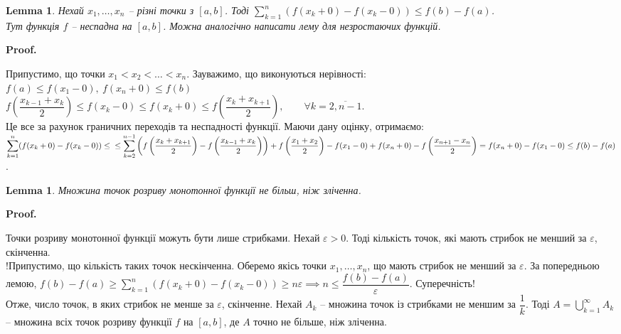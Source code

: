 \documentclass[a4paper, 10pt]{article}
\makeatletter
\def\qed{$\blacksquare$}
\theoremstyle{theoremdd}
\theoremstyle{theoremdd}
\theoremstyle{theoremdd}
\theoremstyle{theoremdd}
\theoremstyle{theoremdd}
\theoremstyle{theoremdd}
\theoremstyle{theoremdd}
\theoremstyle{theoremdd}
\newtheorem{lemma}[theorem]{Lemma}
\theoremstyle{theoremdd}
\renewenvironment{proof}[1][Proof.\\]{\par
\pushQED{\hfill \qed}%
\normalfont \topsep6\p@\@plus6\p@\relax
\trivlist
\item\relax
{\bfseries
#1\@addpunct{.}}\hspace\labelsep\ignorespaces
}{%
\popQED\endtrivlist\@endpefalse
}
\makeatother
\begin{document}
\begin{lemma}
\label{sum_of_jump_estimation}
Нехай $x_1,\dots,x_n$ -- різні точки з $[a,b]$. Тоді $\displaystyle\sum_{k=1}^n (f(x_k+0) - f(x_k-0)) \leq f(b) - f(a)$.\\
Тут функція $f$ -- неспадна на $[a,b]$. Можна аналогічно написати лему для незростаючих функцій.
\end{lemma}

\begin{proof}
Припустимо, що точки $x_1 < x_2 < \dots < x_n$. Зауважимо, що виконуються нерівності:\\
$f(a) \leq f(x_1-0),\ f(x_n+0) \leq f(b)$\\
$f\left( \dfrac{x_{k-1} + x_k}{2} \right) \leq f(x_k-0) \leq f(x_k+0) \leq f\left( \dfrac{x_k+x_{k+1}}{2} \right),\qquad \forall k = \overline{2,n-1}$.\\
Це все за рахунок граничних переходів та неспадності функції. Маючи дану оцінку, отримаємо:\\
$\displaystyle\sum_{k=1}^n (f(x_k+0) - f(x_k-0)) \leq \\ \leq \sum_{k=2}^{n-1} \left( f\left( \dfrac{x_k + x_{k+1}}{2}\right) - f\left( \dfrac{x_{k-1} + x_k}{2} \right) \right) + f\left( \dfrac{x_1+x_2}{2}\right) - f(x_1-0) + f(x_n+0) - f\left( \dfrac{x_{n+1}-x_n}{2}\right) = f(x_n+0) - f(x_1-0) \leq f(b) - f(a)$.
\end{proof}

\begin{lemma}
Множина точок розриву монотонної функції не більш, ніж зліченна.
\end{lemma}

\begin{proof}
Точки розриву монотонної функції можуть бути лише стрибками. Нехай $\varepsilon > 0$. Тоді кількість точок, які мають стрибок не менший за $\varepsilon$, скінченна.\\
!Припустимо, що кількість таких точок нескінченна. Оберемо якісь точки $x_1,\dots,x_n$, що мають стрибок не менший за $\varepsilon$. За попередньою лемою, $f(b) - f(a) \geq \displaystyle\sum_{k=1}^n (f(x_k+0) - f(x_k-0)) \geq n \varepsilon \implies n \leq \dfrac{f(b)-f(a)}{\varepsilon}$. Суперечність!\\
Отже, число точок, в яких стрибок не менше за $\varepsilon$, скінченне. Нехай $A_k$ -- множина точок із стрибками не меншим за $\dfrac{1}{k}$. Тоді $A = \displaystyle\bigcup_{k = 1}^\infty A_k$ -- множина всіх точок розриву функції $f$ на $[a,b]$, де $A$ точно не більше, ніж зліченна.
\end{proof}
\end{document}
